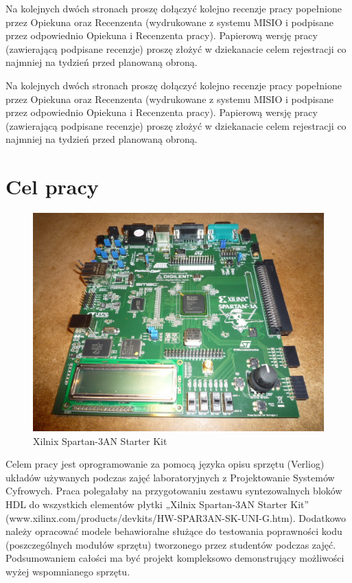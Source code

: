 \documentclass[a4paper,12pt]{article}
\begin{document}
\newpage
\noindent
Na kolejnych dwóch stronach proszę dołączyć kolejno recenzje pracy popełnione przez Opiekuna oraz Recenzenta (wydrukowane z systemu MISIO i podpisane przez odpowiednio Opiekuna i Recenzenta pracy). Papierową wersję pracy (zawierającą podpisane recenzje) proszę złożyć w dziekanacie celem rejestracji co najmniej na tydzień przed planowaną obroną.

\newpage
\noindent
Na kolejnych dwóch stronach proszę dołączyć kolejno recenzje pracy popełnione przez Opiekuna oraz Recenzenta (wydrukowane z systemu MISIO i podpisane przez odpowiednio Opiekuna i Recenzenta pracy). Papierową wersję pracy (zawierającą podpisane recenzje) proszę złożyć w dziekanacie celem rejestracji co najmniej na tydzień przed planowaną obroną.


\vspace{85mm}
\newpage
\tableofcontents

\newpage
\section{Cel pracy}

\begin{figure}[htb]
   \centering
   \includegraphics{grafika/spartan3an.jpg}
   \caption{Xilnix Spartan-3AN Starter Kit}
\end{figure}

Celem pracy jest oprogramowanie za pomocą języka opisu sprzętu (Verliog) układów używanych podczas zajęć laboratoryjnych z Projektowanie Systemów Cyfrowych. Praca polegałaby na przygotowaniu zestawu syntezowalnych bloków HDL do wszystkich elementów płytki „Xilnix Spartan-3AN Starter Kit” (www.xilinx.com/products/devkits/HW-SPAR3AN-SK-UNI-G.htm). Dodatkowo należy opracować modele behawioralne służące do testowania poprawności kodu (poszczególnych modułów sprzętu) tworzonego przez studentów podczas zajęć. Podsumowaniem całości ma być projekt kompleksowo demonstrujący możliwości wyżej wspomnianego sprzętu.
\end{document}
